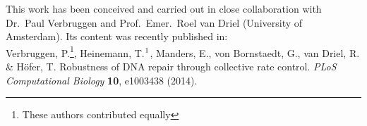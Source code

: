This work has been conceived and carried out in close collaboration with Dr.\ Paul Verbruggen and Prof.\ Emer.\ Roel van Driel (University of Amsterdam). Its content was recently published in:\\

Verbruggen, P.\footnote{These authors contributed equally}, Heinemann, T.$^\text{\scriptsize{1}}$, Manders, E., von Bornstaedt, G., van Driel, R. \& H\"{o}fer, T. Robustness of DNA repair through collective rate control. \textit{PLoS Computational Biology} \textbf{10}, e1003438 (2014).







